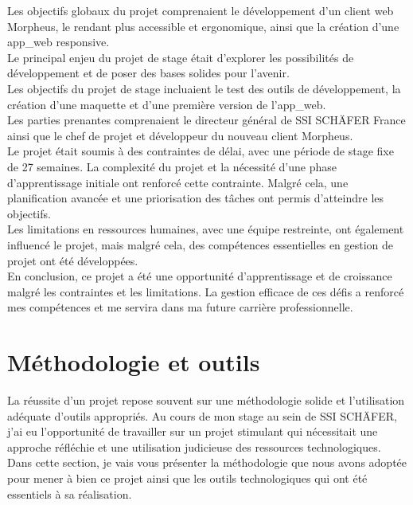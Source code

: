 \documentclass[a4paper, 12pt, french]{article}
\begin{document}
				Les objectifs globaux du projet comprenaient le développement d'un client web Morpheus, le rendant plus accessible et ergonomique, ainsi que la création d'une \gls{app_web} responsive.\\

				Le principal enjeu du projet de stage était d'explorer les possibilités de développement et de poser des bases solides pour l'avenir.\\

				Les objectifs du projet de stage incluaient le test des outils de développement, la création d'une maquette et d'une première version de l'\gls{app_web}.\\

				Les parties prenantes comprenaient le directeur général de SSI SCHÄFER France ainsi que le chef de projet et développeur du nouveau client Morpheus.\\

				Le projet était soumis à des contraintes de délai, avec une période de stage fixe de 27 semaines. La complexité du projet et la nécessité d'une phase d'apprentissage initiale ont renforcé cette contrainte. Malgré cela, une planification avancée et une priorisation des tâches ont permis d'atteindre les objectifs.\\

				Les limitations en ressources humaines, avec une équipe restreinte, ont également influencé le projet, mais malgré cela, des compétences essentielles en gestion de projet ont été développées.\\

				En conclusion, ce projet a été une opportunité d'apprentissage et de croissance malgré les contraintes et les limitations. La gestion efficace de ces défis a renforcé mes compétences et me servira dans ma future carrière professionnelle.

		\newpage

		\part{Méthodologie et outils}\label{section:methodologie}
			La réussite d'un projet repose souvent sur une méthodologie solide et l'utilisation adéquate d'outils appropriés. Au cours de mon stage au sein de SSI SCHÄFER, j'ai eu l'opportunité de travailler sur un projet stimulant qui nécessitait une approche réfléchie et une utilisation judicieuse des ressources technologiques. Dans cette section, je vais vous présenter la méthodologie que nous avons adoptée pour mener à bien ce projet ainsi que les outils technologiques qui ont été essentiels à sa réalisation.\\
\end{document}
